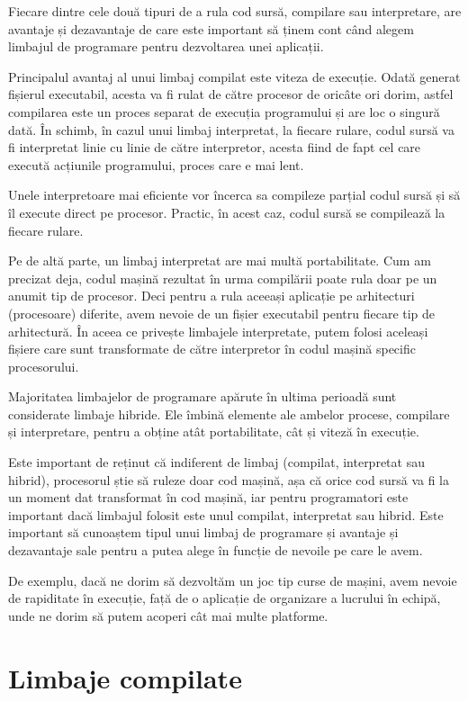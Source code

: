 Fiecare dintre cele două tipuri de a rula cod sursă, compilare sau interpretare,
are avantaje și dezavantaje de care este important să ținem cont când alegem
limbajul de programare pentru dezvoltarea unei aplicații.

Principalul avantaj al unui limbaj compilat este viteza de execuție. Odată
generat fișierul executabil, acesta va fi rulat de către procesor de oricâte ori
dorim, astfel compilarea este un proces separat de execuția programului și are
loc o singură dată. În schimb, în cazul unui limbaj interpretat, la fiecare
rulare, codul sursă va fi interpretat linie cu linie de către
interpretor, acesta fiind de fapt cel care execută acțiunile programului, proces
care e mai lent.

Unele interpretoare mai eficiente vor încerca sa compileze parțial codul sursă
și să îl execute direct pe procesor. Practic, în acest caz, codul sursă se
compilează la fiecare rulare.

Pe de altă parte, un limbaj interpretat are mai multă portabilitate. Cum am
precizat deja, codul mașină rezultat în urma compilării poate rula doar pe un
anumit tip de procesor. Deci pentru a rula aceeași aplicație pe arhitecturi
(procesoare) diferite, avem nevoie de un fișier executabil pentru fiecare tip de
arhitectură. În aceea ce privește limbajele interpretate, putem folosi aceleași
fișiere care sunt transformate de către interpretor în codul mașină specific
procesorului.

Majoritatea limbajelor de programare apărute în ultima perioadă sunt considerate
limbaje hibride. Ele îmbină elemente ale ambelor procese, compilare și
interpretare, pentru a obține atât portabilitate, cât și viteză în execuție.

Este important de reținut că indiferent de limbaj (compilat, interpretat sau
hibrid), procesorul știe să ruleze doar cod mașină, așa că orice cod sursă va fi
la un moment dat transformat în cod mașină, iar pentru programatori este
important dacă limbajul folosit este unul compilat, interpretat sau hibrid. Este
important să cunoaștem tipul unui limbaj de programare și avantaje și
dezavantaje sale pentru a putea alege în funcție de nevoile pe care le avem.

De exemplu, dacă ne dorim să dezvoltăm un joc tip curse de mașini, avem nevoie
de rapiditate în execuție, față de o aplicație de organizare a lucrului în
echipă, unde ne dorim să putem acoperi cât mai multe platforme.

\section{Limbaje compilate}
\label{sec:appdev:compiled-lang}

